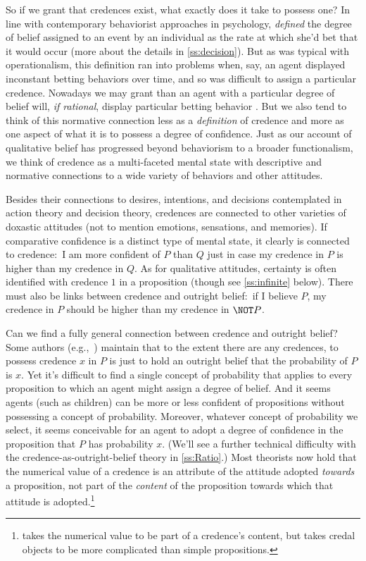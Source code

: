 So if we grant that credences exist, what exactly does it take to possess one? In line with contemporary behaviorist approaches in psychology, \citet{deFinettiForesight} \emph{defined} the degree of belief assigned to an event by an individual as the rate at which she'd bet that it would occur (more about the details in \autoref{ss:decision}). But as was typical with operationalism, this definition ran into problems when, say, an agent displayed inconstant betting behaviors over time, and so was difficult to assign a particular credence. Nowadays we may grant than an agent with a particular degree of belief will, \emph{if rational}, display particular betting behavior \citep{ChristensenPlace}. But we also tend to think of this normative connection less as a \emph{definition} of credence and more as one aspect of what it is to possess a degree of confidence. Just as our account of qualitative belief has progressed beyond behaviorism to a broader functionalism, we think of credence as a multi-faceted mental state with descriptive and normative connections to a wide variety of behaviors and other attitudes.

Besides their connections to desires, intentions, and decisions contemplated in action theory and decision theory, credences are connected to other varieties of doxastic attitudes (not to mention emotions, sensations, and memories). If comparative confidence is a distinct type of mental state, it clearly is connected to credence:\ I am more confident of $P$ than $Q$ just in case my credence in $P$ is higher than my credence in $Q$. As for qualitative attitudes, certainty is often identified with credence $1$ in a proposition (though see \autoref{ss:infinite} below). There must also be links between credence and outright belief:\ if I believe $P$, my credence in $P$ should be higher than my credence in $\NOT P$. 

Can we find a fully general connection between credence and outright belief? Some authors (e.g.,\ \citealp{HoltonModel}) maintain that to the extent there are any credences, to possess credence $x$ in $P$ is just to hold an outright belief that the probability of $P$ is $x$.\label{titelbaum-outright} Yet it's difficult to find a single concept of probability that applies to every proposition to which an agent might assign a degree of belief. And it seems agents (such as children) can be more or less confident of propositions without possessing a concept of probability. Moreover, whatever concept of probability we select, it seems conceivable for an agent to adopt a degree of confidence in the proposition that $P$ has probability $x$. (We'll see a further technical difficulty with the credence-as-outright-belief theory in \autoref{ss:Ratio}.) Most theorists now hold that the numerical value of a credence is an attribute of the attitude adopted \emph{towards} a proposition, not part of the \emph{content} of the proposition towards which that attitude is adopted.\footnote
{\citet{MossProbabilistic} takes the numerical value to be part of a credence's content, but takes credal objects to be more complicated than simple propositions.}

